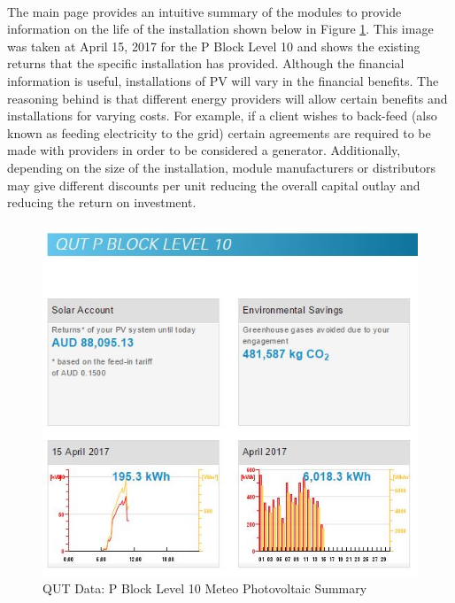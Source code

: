 \paragraph{}
The main page provides an intuitive summary of the modules to provide information on the life of the installation shown below in Figure \ref{fig:qut-lvl10-meteo-summary}. This image was taken at April 15, 2017 for the P Block Level 10 and shows the existing returns that the specific installation has provided. Although the financial information is useful, installations of PV will vary in the financial benefits. The reasoning behind is that different energy providers will allow certain benefits and installations for varying costs. For example, if a client wishes to back-feed (also known as feeding electricity to the grid) certain agreements are required to be made with providers in order to be considered a generator. Additionally, depending on the size of the installation, module manufacturers or distributors may give different discounts per unit reducing the overall capital outlay and reducing the return on investment.       

\begin{figure}[H]
	\hfill\includegraphics[width = 150mm]{images/metering/meteo/lvl10-summary-page}\hspace*{\fill}
	\caption{QUT Data: P Block Level 10 Meteo Photovoltaic Summary} 
	\label{fig:qut-lvl10-meteo-summary}
\end{figure}

